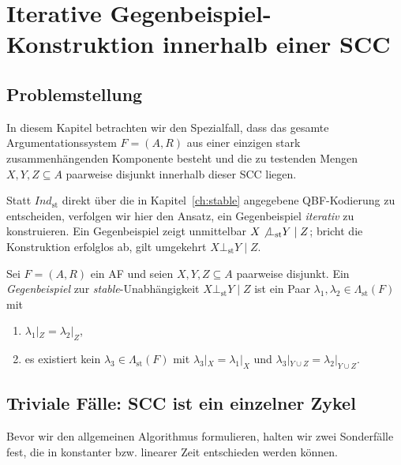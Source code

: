 \chapter{Iterative Gegenbeispiel-Konstruktion innerhalb einer SCC}
\label{ch:intra-scc-cegar}

\section{Problemstellung}
\label{sec:intra-scc-problem}

In diesem Kapitel betrachten wir den Spezialfall, dass das gesamte
Argumentationssystem \(F=(A,R)\) aus einer einzigen stark zusammenhängenden
Komponente besteht und die zu testenden Mengen \(X,Y,Z\subseteq A\) paarweise
disjunkt innerhalb dieser SCC liegen.

Statt \(\textit{Ind}_{\mathrm{st}}\) direkt über die in
Kapitel~\ref{ch:stable} angegebene QBF-Kodierung zu entscheiden, verfolgen wir
hier den Ansatz, ein Gegenbeispiel \emph{iterativ} zu konstruieren. Ein
Gegenbeispiel zeigt unmittelbar
\(X\not\bot_{\mathrm{st}} Y \mid Z\); bricht die Konstruktion erfolglos ab,
gilt umgekehrt \(X \bot_{\mathrm{st}} Y \mid Z\).

\begin{Definition}
    \label{def:gegenbsp-st}
    Sei \(F=(A,R)\) ein AF und seien \(X,Y,Z\subseteq A\) paarweise
    disjunkt. Ein \emph{Gegenbeispiel} zur \textit{stable}-Unabhängigkeit
    \(X \bot_{\mathrm{st}} Y \mid Z\) ist ein Paar
    \(\lambda_1,\lambda_2 \in \varLambda_{\mathrm{st}}(F)\) mit
    \begin{enumerate}
        \item \(\lambda_1|_Z = \lambda_2|_Z\),
        \item es existiert kein \(\lambda_3\in\varLambda_{\mathrm{st}}(F)\)
              mit \(\lambda_3|_X = \lambda_1|_X\) und
              \(\lambda_3|_{Y\cup Z} = \lambda_2|_{Y\cup Z}\).
    \end{enumerate}
\end{Definition}

\section{Triviale Fälle: SCC ist ein einzelner Zykel}
\label{sec:intra-scc-zykel}

Bevor wir den allgemeinen Algorithmus formulieren, halten wir zwei
Sonderfälle fest, die in konstanter bzw. linearer Zeit entschieden werden
können.

